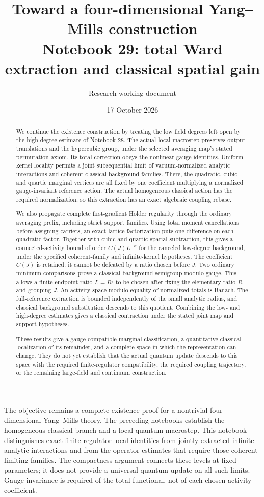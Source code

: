 \documentclass[11pt]{article}
\title{Toward a four-dimensional Yang--Mills construction\\
\large Notebook 29: total Ward extraction and classical spatial gain}
\author{Research working document}
\date{17 October 2026}
\theoremstyle{remark}
\begin{document}
\maketitle
\begin{abstract}
We continue the existence construction by treating the low field degrees
left open by the high-degree estimate of Notebook 28. The actual local
macrostep preserves output translations and the hypercubic group, under
the selected averaging map's stated permutation axiom. Its total
correction obeys the nonlinear gauge identities. Uniform kernel
locality permits a joint subsequential limit of vacuum-normalized
analytic interactions and coherent classical background families. There, the
quadratic, cubic and quartic marginal vertices are all fixed by one
coefficient multiplying a normalized gauge-invariant reference action.
The actual homogeneous classical action has the required normalization,
so this extraction has an exact algebraic coupling rebase.

We also propagate complete first-gradient H\"older regularity through
the ordinary averaging prefix, including strict support families.
Using total moment cancellations before assigning carriers, an exact
lattice factorization puts one difference on each quadratic factor.
Together with cubic and quartic spatial subtraction, this gives a
connected-activity bound of order \(C(J)L^{-\alpha}\) for the canceled
low-degree background, under the specified coherent-family and
infinite-kernel hypotheses. The coefficient \(C(J)\) is retained:
it cannot be defeated by a ratio chosen before \(J\).
Two ordinary minimum comparisons prove a classical background
semigroup modulo gauge. This allows a finite endpoint ratio
\(L=R^q\) to be chosen after fixing the elementary ratio \(R\)
and grouping \(J\).
An activity space modulo equality of normalized totals is Banach.
The full-reference extraction is bounded independently of the
small analytic radius, and classical background substitution
descends to this quotient. Combining the low- and high-degree
estimates gives a classical contraction under the stated joint
map and support hypotheses.

These results give a gauge-compatible marginal classification,
a quantitative classical localization of its remainder, and a
complete space in which the representation can change. They do
not yet establish that the actual quantum update descends to
this space with the required finite-regulator compatibility,
the required coupling trajectory,
or the remaining large-field and continuum construction.
\end{abstract}

The objective remains a complete existence proof for a nontrivial
four-dimensional Yang--Mills theory. The preceding notebooks establish
the homogeneous classical branch and a local quantum macrostep.
This notebook distinguishes exact finite-regulator local identities
from jointly extracted infinite analytic interactions and from the
operator estimates that require those coherent limiting families.
The compactness argument connects these levels at fixed parameters;
it does not provide a universal quantum update on all such limits.
Gauge invariance is required of the total functional,
not of each chosen activity coefficient.
\end{document}
